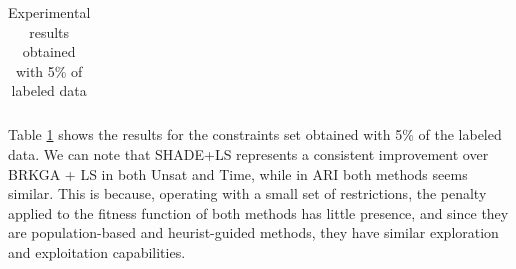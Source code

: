 \documentclass[review]{elsarticle}
\begin{document}
\begin{table}[!h]
{\begin{tabular}{l ccc c ccc}
		\end{tabular}}

	\caption{Experimental results obtained with 5\% of labeled data}
	\label{tab:results5}
\end{table}

Table \ref{tab:results5} shows the results for the constraints set obtained with 5\% of the labeled data. We can note that SHADE+LS represents a consistent improvement over BRKGA + LS in both Unsat and Time, while in ARI both methods seems similar. This is because, operating with a small set of restrictions, the penalty applied to the fitness function of both methods has little presence, and since they are population-based and heurist-guided methods, they have similar exploration and exploitation capabilities.
\end{document}
